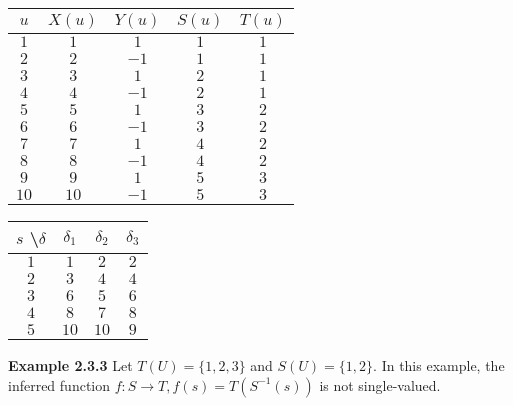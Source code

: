 \documentclass[11pt]{article}
\begin{document}
 \begin{center}
 \begin{tabular}{ |c||c|c|c|c| } 

 \hline
 $ u $ & $ X(u) $ & $ Y(u) $ & $ S(u) $ & $ T(u) $ \\ 
 \hline
 \hline
 $ 1 $ & $ 1 $ & $ 1 $ & $ 1 $ & $ 1 $ \\
 \hline
 $ 2 $ & $ 2 $ & $ -1 $ & $ 1 $ & $ 1 $ \\
 \hline
 $ 3 $ & $ 3 $ & $ 1 $ & $ 2 $ & $ 1 $ \\
 \hline
 $ 4 $ & $ 4 $ & $ -1 $ & $ 2 $ & $ 1 $ \\
 \hline
 $ 5 $ & $ 5 $ & $ 1 $ & $ 3 $ & $ 2 $ \\
 \hline
 $ 6 $ & $ 6 $ & $ -1 $ & $ 3 $ & $ 2 $ \\
 \hline
 $ 7 $ & $ 7 $ & $ 1 $ & $ 4 $ & $ 2 $ \\
 \hline
 $ 8 $ & $ 8 $ & $ -1 $ & $ 4 $ & $ 2 $ \\
 \hline
 $ 9 $ & $ 9 $ & $ 1 $ & $ 5 $ & $ 3 $ \\
 \hline
 $ 10 $ & $ 10 $ & $ -1 $ & $ 5 $ & $ 3 $ \\
 \hline 
 \end{tabular} 
 \quad
 \begin{tabular}{ |c||c|c|c| } 

 \hline
 $ s $ \textbackslash $ \delta $ & $ \delta_1 $ & $ \delta_2 $ & $ \delta_3 $  \\ 
 \hline
 \hline
 $ 1 $ & $ 1 $ & $ 2 $ & $ 2 $ \\
 \hline
 $ 2 $ & $ 3 $ & $ 4 $ & $ 4 $ \\
 \hline
 $ 3 $ & $ 6 $ & $ 5 $ & $ 6 $ \\
 \hline
 $ 4 $ & $ 8 $ & $ 7 $ & $ 8 $ \\
 \hline 
 $ 5 $ & $ 10 $ & $ 10 $ & $ 9 $ \\
 \hline
 
 \end{tabular}
 \end{center} 

 \bigskip
 \bigskip 
 \textbf{Example 2.3.3} \quad Let $ T(U) = \{1, 2, 3\} $ and $ S(U) = \{1, 2\} $. In this example, the inferred function $ f: S \rightarrow T, f(s) = T(S^{-1}(s)) $ is not single-valued. \\ 
\end{document}
